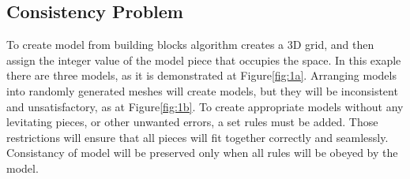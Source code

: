 \documentclass[b5paper,twoside,11pt]{article}
\renewcommand{\figurename}{Figure}
\begin{document}
 \subsection{Consistency Problem}
To create model from building blocks algorithm creates a 3D grid, and then assign the integer value of the model piece that occupies the space. In this exaple there are three models, as it is demonstrated at \figurename\ref{fig:1a}.
Arranging models into randomly generated meshes will create models, but they will be inconsistent and unsatisfactory, as at \figurename\ref{fig:1b}. To create appropriate models without any levitating pieces, or other unwanted errors, a set rules must be added. Those restrictions will ensure that all pieces will fit together correctly and seamlessly. Consistancy of model will be preserved only when all rules will be obeyed by the model.
\end{document}
